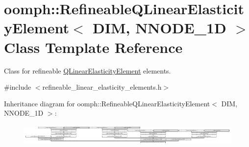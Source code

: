 \hypertarget{classoomph_1_1RefineableQLinearElasticityElement}{}\section{oomph\+:\+:Refineable\+Q\+Linear\+Elasticity\+Element$<$ D\+IM, N\+N\+O\+D\+E\+\_\+1D $>$ Class Template Reference}
\label{classoomph_1_1RefineableQLinearElasticityElement}


Class for refineable \hyperlink{classoomph_1_1QLinearElasticityElement}{Q\+Linear\+Elasticity\+Element} elements.  




{\ttfamily \#include $<$refineable\+\_\+linear\+\_\+elasticity\+\_\+elements.\+h$>$}

Inheritance diagram for oomph\+:\+:Refineable\+Q\+Linear\+Elasticity\+Element$<$ D\+IM, N\+N\+O\+D\+E\+\_\+1D $>$\+:\begin{figure}[H]
\begin{center}
\leavevmode
\includegraphics[height=1.085271cm]{classoomph_1_1RefineableQLinearElasticityElement}
\end{center}
\end{figure}
